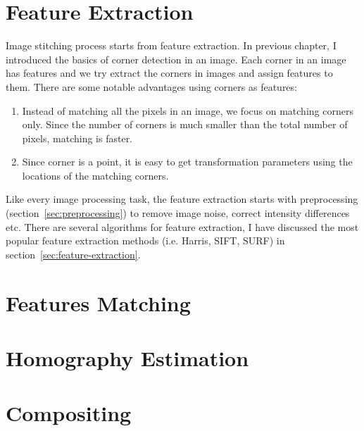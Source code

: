 \chapter{Feature Extraction}
Image stitching process starts  from feature extraction. In previous chapter, I introduced the basics of corner detection in an image. Each corner in an image has features and we try extract the corners in images and assign features to them. There are some notable advantages using corners as features:
\begin{enumerate}
	\item Instead of matching all the pixels in an image, we focus on matching corners only. Since the number of corners is much smaller than the total number of pixels, matching is faster.
	\item Since corner is a point, it is easy to get transformation parameters using the locations of the matching corners. 
\end{enumerate}
Like every image processing task, the feature extraction starts with preprocessing (section~\ref{sec:preprocessing}) to remove image noise, correct intensity differences etc. There are several algorithms for feature extraction, I have discussed the most popular feature extraction methods (i.e. Harris, SIFT, SURF) in section~\ref{sec:feature-extraction}.




\chapter{Features Matching}
\label{chapter:feature-matching}



\chapter{Homography Estimation}
\label{chapter:homography-estimation}


\chapter{Compositing}
\label{chapter:compositing}


